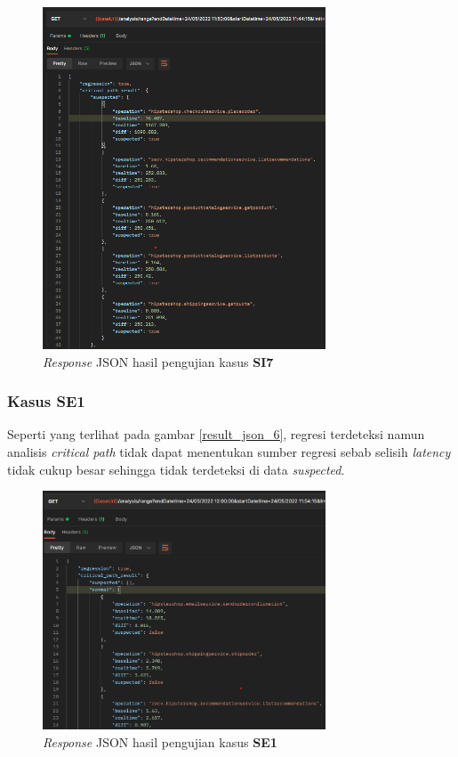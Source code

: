 \begin{figure}[!htb]
	\centering
	\includegraphics[width=0.75\textwidth]{resources/ch4/json/7.png}
	\caption{\textit{Response} JSON hasil pengujian kasus \textbf{SI7}}
	\label{result_json_7}
\end{figure}
%
\pagebreak

\subsubsection{Kasus SE1}
Seperti yang terlihat pada gambar \ref{result_json_6}, regresi terdeteksi namun analisis \textit{critical path} tidak dapat menentukan sumber regresi sebab selisih \textit{latency} tidak cukup besar sehingga tidak terdeteksi di data \textit{suspected}.
\begin{figure}[!htb]
	\centering
	\includegraphics[width=0.75\textwidth]{resources/ch4/json/8.png}
	\caption{\textit{Response} JSON hasil pengujian kasus \textbf{SE1}}
	\label{result_json_8}
\end{figure}

